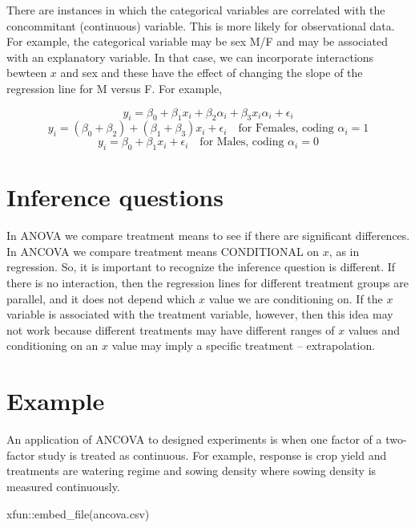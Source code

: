 \documentclass[
]{book}
\newenvironment{Shaded}{\begin{snugshade}}{\end{snugshade}}
\newcommand{\FunctionTok}[1]{\textcolor[rgb]{0.00,0.00,0.00}{#1}}
\newcommand{\NormalTok}[1]{#1}
\newcommand{\SpecialCharTok}[1]{\textcolor[rgb]{0.00,0.00,0.00}{#1}}
\newcommand{\StringTok}[1]{\textcolor[rgb]{0.31,0.60,0.02}{#1}}
\begin{document}
There are instances in which the categorical variables are correlated with the concommitant (continuous) variable. This is more likely for observational data. For example, the categorical variable may be sex M/F and may be associated with an explanatory variable. In that case, we can incorporate interactions bewteen \(x\) and sex and these have the effect of changing the slope of the regression line for M versus F. For example,

\[y_i = \beta_0 + \beta_1x_i + \beta_2 \alpha_i + \beta_3 x_i\alpha_i + \epsilon_i\]
\[y_i = (\beta_0 + \beta_2) + (\beta_1 + \beta_3)x_i + \epsilon_i \quad\text{for Females, coding }\alpha_i = 1\]
\[y_i = \beta_0 + \beta_1x_i + \epsilon_i \quad\text{for Males, coding }\alpha_i = 0\]

\hypertarget{inference-questions}{%
\section{Inference questions}\label{inference-questions}}

In ANOVA we compare treatment means to see if there are significant differences. In ANCOVA we compare treatment means CONDITIONAL on \(x\), as in regression. So, it is important to recognize the inference question is different. If there is no interaction, then the regression lines for different treatment groups are parallel, and it does not depend which \(x\) value we are conditioning on. If the \(x\) variable is associated with the treatment variable, however, then this idea may not work because different treatments may have different ranges of \(x\) values and conditioning on an \(x\) value may imply a specific treatment -- extrapolation.

\hypertarget{example}{%
\section{Example}\label{example}}

An application of ANCOVA to designed experiments is when one factor of a two-factor study is treated as continuous. For example, response is crop yield and treatments are watering regime and sowing density where sowing density is measured continuously.

\begin{Shaded}
\begin{Highlighting}[]
\NormalTok{xfun}\SpecialCharTok{::}\FunctionTok{embed\_file}\NormalTok{(}\StringTok{\textquotesingle{}ancova.csv\textquotesingle{}}\NormalTok{)}
\end{Highlighting}
\end{Shaded}
\end{document}

